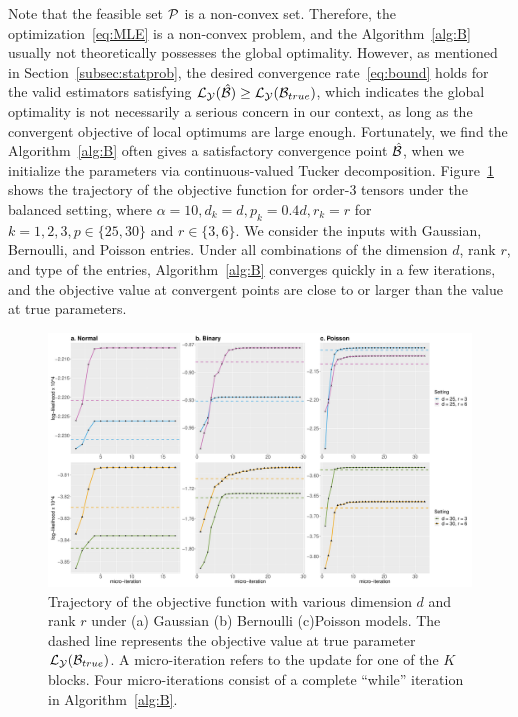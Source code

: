 \documentclass[12pt]{article}
\theoremstyle{plain}
\theoremstyle{definition}
\begin{document}
Note that the feasible set $\mathcal{P}$ is a non-convex set. Therefore, the optimization~\eqref{eq:MLE} is a non-convex problem, and the Algorithm~\ref{alg:B} usually not theoretically possesses the global optimality. However, as mentioned in Section~\ref{subsec:statprob}, the desired convergence rate~\eqref{eq:bound} holds for the valid estimators satisfying $\mathcal{L}_{\mathcal{Y}} (\hat {\mathcal{B}}) \geq \mathcal{L}_{\mathcal{Y}} (\mathcal{B}_{true})$, which indicates the global optimality is not necessarily a serious concern in our context, as long as the convergent objective of local optimums are large enough. Fortunately, we find the  Algorithm~\ref{alg:B}  often gives a satisfactory convergence point $\hat {\mathcal{B}}$, when we initialize the parameters via continuous-valued Tucker decomposition. Figure~\ref{fig:loglike} shows the trajectory of the objective function for order-3 tensors under the balanced setting, where $\alpha = 10, d_k = d, p_k = 0.4d, r_k = r$ for $ k = 1,2,3, p \in \{25,30\}$  and $r \in \{3, 6\}$. We consider the inputs with Gaussian, Bernoulli, and Poisson entries. Under all combinations of the dimension $d$, rank $r$, and type of the entries, Algorithm~\ref{alg:B} converges quickly in a few iterations, and the objective value at convergent points are close to or larger than the value at true parameters.  


\begin{figure}[t]
\centering
\includegraphics[width=15cm]{loglike}
\caption{Trajectory of the objective function with various dimension $d$ and rank $r$ under (a) Gaussian (b) Bernoulli (c)Poisson models. The dashed line represents the objective value at true parameter $\mathcal{L}_{\mathcal{Y}}(\mathcal{B}_{true})$. A micro-iteration refers to the update for one of the $K$ blocks. Four micro-iterations consist of a complete ``while'' iteration in Algorithm~\ref{alg:B}.}\label{fig:loglike}
\end{figure}
\end{document}
